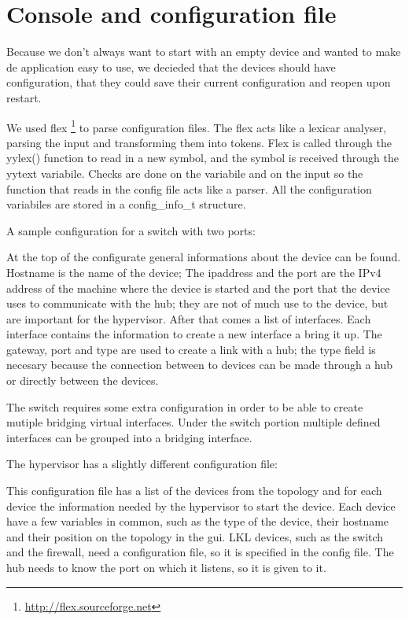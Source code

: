 \section{Console and configuration file}
\label{sec:dev-conf}

Because we don't always want to start with an empty device and wanted to make de application easy to use, we decieded that the
devices should have configuration, that they could save their current configuration and reopen upon restart. 

We used flex \footnote{\url{http://flex.sourceforge.net}} to parse configuration files. The flex acts like a lexicar analyser, 
parsing the input and transforming them into tokens. Flex is called through the yylex() function to read in a new symbol, and the
symbol is received through the yytext variabile. Checks are done on the variabile and on the input so the function that reads in 
the config file acts like a parser. All the configuration variabiles are stored in a config_info_t structure.

A sample configuration for a switch with two ports:
\lstset{language=inform,caption=Example switch configuration file,label=lst:dconf}


At the top of the configurate general informations about the device can be found. Hostname is the name of the device;
The ipaddress and the port are the IPv4 address of the machine where the device is started and the port that the device
uses to communicate with the hub; they are not of much use to the device, but are important for the hypervisor.
After that comes a list of interfaces.	Each interface contains the information to create a new interface a bring it up.
The gateway, port and type are used to create a link with a hub; the type field is necesary because the connection between
to devices can be made through a hub or directly between the devices. 

The switch requires some extra configuration in order to be able to create mutiple bridging virtual interfaces. 
Under the switch portion multiple defined interfaces can be grouped into a bridging interface.

The hypervisor has a slightly different configuration file:
\lstset{language=inform,caption=Example hypervisor configuration file,label=lst:hconf}

This configuration file has a list of the devices from the topology and for each device the information needed by the hypervisor to
start the device. Each device have a few variables in common, such as the type of the device, their hostname and their position on
the topology in the gui. LKL devices, such as the switch and the firewall, need a configuration file, so it is specified in the
config file. The hub needs to know the port on which it listens, so it is given to it.

